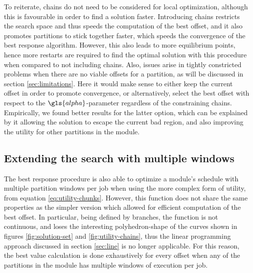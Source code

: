 \documentclass[main.tex]{subfiles}
\begin{document}

To reiterate, chains do not need to be considered for local optimization, although this is favourable in order to find a solution faster.
Introducing chains restricts the search space and thus speeds the computation of the best offset, and it also promotes partitions to stick together faster, which speeds the convergence of the best response algorithm.
However, this also leads to more equilibrium points, hence more restarts are required to find the optimal solution with this procedure when compared to not including chains.
Also, issues arise in tightly constricted problems when there are no viable offsets for a partition, as will be discussed in section \ref{sec:limitations}.
Here it would make sense to either keep the current offset in order to promote convergence, or alternatively, select the best offset with respect to the $\gls{alpha}$-parameter regardless of the constraining chains.
Empirically, we found better results for the latter option, which can be explained by it allowing the solution to escape the current bad region, and also improving the utility for other partitions in the module.

\subsection{Extending the search with multiple windows}

The best response procedure is also able to optimize a module's schedule with multiple partition windows per job when using the more complex form of utility, from equation \ref{eq:utility-chunks}.
However, this function does not share the same properties as the simpler version which allowed for efficient computation of the best offset.
In particular, being defined by branches, the function is not continuous, and loses the interesting polyhedron-shape of the curves shown in figures \ref{fig:solution-set} and \ref{fig:utility-chains}, thus the linear programming approach discussed in section \ref{sec:line} is no longer applicable.
For this reason, the best value calculation is done exhaustively for every offset when any of the partitions in the module has multiple windows of execution per job.
\end{document}
